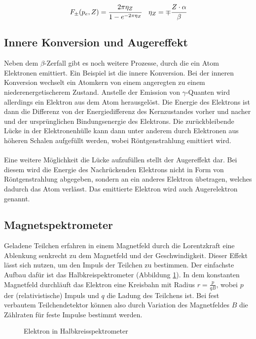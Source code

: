 \begin{align}
F_\pm(p_e,Z) &= \cfrac{2\pi\eta_Z}{1-e^{-2\pi\eta_Z}} & \eta_Z = \mp \cfrac{Z\cdot \alpha}{\beta}
\label{equ:fermi}
\end{align}


\subsection{Innere Konversion und Augereffekt}
Neben dem $\beta$-Zerfall gibt es noch weitere Prozesse, durch die ein Atom Elektronen emittiert. Ein Beispiel ist die innere Konversion. Bei der inneren Konversion wechselt ein Atomkern von einem angeregten zu einem niederenergetischerem Zustand. Anstelle der Emission von $\gamma$-Quanten wird allerdings ein Elektron aus dem Atom herausgelöst. Die Energie des Elektrons ist dann die Differenz von der Energiedifferenz des Kernzustandes vorher und nacher und der ursprünglichen Bindungsenergie des Elektrons. Die zurückbleibende Lücke in der Elektronenhülle kann dann unter anderem durch Elektronen aus höheren Schalen aufgefüllt werden, wobei Röntgenstrahlung emittiert wird.\\ \\
Eine weitere Möglichkeit die Lücke aufzufüllen stellt der Augereffekt dar. Bei diesem wird die Energie des Nachrückenden Elektrons nicht in Form von Röntgenstrahlung abgegeben, sondern an ein anderes Elektron übetragen, welches dadurch das Atom verlässt. Das emittierte Elektron wird auch Augerelektron genannt.

\subsection{Magnetspektrometer}
Geladene Teilchen erfahren in einem Magnetfeld durch die Lorentzkraft eine Ablenkung senkrecht zu dem Magnetfeld und der Geschwindigkeit. Dieser Effekt lässt sich nutzen, um den Impuls der Teilchen zu bestimmen. Der einfachste Aufbau dafür ist das Halbkreispektrometer (Abbildung \ref{fig:halbkreis}). In dem konstanten Magnetfeld durchläuft das Elektron eine Kreisbahn mit Radius $r=\frac{p}{qB}$, wobei $p$ der (relativistische) Impuls und $q$ die Ladung des Teilchens ist. Bei fest verbautem Teilchendetektor können also durch Variation des Magnetfeldes $B$ die Zählraten für feste Impulse bestimmt werden.
\begin{figure}[h]
  \centering
  \caption{Elektron in Halbkreisspektrometer}
  \label{fig:halbkreis}
\end{figure}

